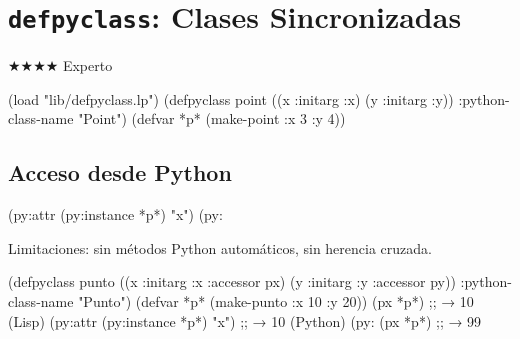 \chapter{\texttt{defpyclass}: Clases Sincronizadas}
\label{chap:defpyclass}
{\huge$\bigstar$}{\huge$\bigstar$}{\huge$\bigstar$}{\huge$\bigstar$} Experto

\begin{lispcode}
(load "lib/defpyclass.lp")
(defpyclass point ((x :initarg :x) (y :initarg :y)) :python-class-name "Point")
(defvar *p* (make-point :x 3 :y 4))
\end{lispcode}

\section{Acceso desde Python}
\begin{lispcode}
(py:attr (py:instance *p*) "x")
(py:%
\end{lispcode}

Limitaciones: sin métodos Python automáticos, sin herencia cruzada.

\begin{examplebox}[title=Instancia dual]
\begin{lispcode}
(defpyclass punto ((x :initarg :x :accessor px) (y :initarg :y :accessor py))
  :python-class-name "Punto")
(defvar *p* (make-punto :x 10 :y 20))
(px *p*)                               ;; → 10 (Lisp)
(py:attr (py:instance *p*) "x")        ;; → 10 (Python)
(py:%
(px *p*)                               ;; → 99
\end{lispcode}
\end{examplebox}

